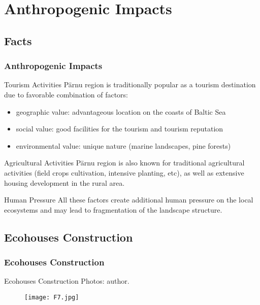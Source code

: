 \documentclass[pdflatex,compress,9pt,
	xcolor={dvipsnames,dvipsnames,svgnames,x11names,table},
	hyperref={colorlinks = true,breaklinks = true, urlcolor = NavyBlue, breaklinks = true}]{beamer}
\begin{document}
\section{Anthropogenic Impacts}
\subsection{Facts}
\begin{frame}\frametitle{Anthropogenic Impacts}

\begin{block}{Tourism Activities}
P\"{a}rnu region is traditionally popular as a \alert{tourism destination} due to favorable combination of factors:
\begin{itemize}
	\item geographic value: advantageous location on the coasts of Baltic Sea
	\item social value: good facilities for the tourism and tourism reputation
	\item environmental value: unique nature (marine landscapes, pine forests)
\end{itemize}
\end{block}

\begin{block}{Agricultural Activities}
P\"{a}rnu region is also known for traditional \alert{agricultural activities} (field crops cultivation, intensive planting, etc), as well as extensive \alert{housing development} in the rural area.
\end{block}

\begin{alertblock}{Human Pressure}
All these factors create additional human pressure on the local ecosystems and may lead to fragmentation of the landscape structure.
\end{alertblock}
\end{frame}

\subsection{Ecohouses Construction}
\begin{frame}\frametitle{Ecohouses Construction}
\begin{examples}{Ecohouses Construction}
Photos: author.
\end{examples}
\begin{figure}[H]
	\centering
		\texttt{[image: F7.jpg]}
\end{figure}
\end{frame}
\end{document}

